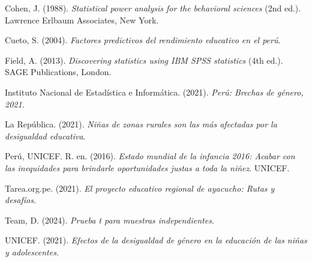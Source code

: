 \documentclass[
]{article}
\newlength{\cslhangindent}
\newenvironment{CSLReferences}[2] %
 {\begin{list}{}{%
  \setlength{\itemindent}{0pt}
  \setlength{\leftmargin}{0pt}
  \setlength{\parsep}{0pt}
  \ifodd #1
   \setlength{\leftmargin}{\cslhangindent}
   \setlength{\itemindent}{-1\cslhangindent}
  \fi
  \setlength{\itemsep}{#2\baselineskip}}}
 {\end{list}}
\begin{document}
\label{refs}
\begin{CSLReferences}{1}{0}
Cohen, J. (1988). \emph{Statistical power analysis for the behavioral
sciences} (2nd ed.). Lawrence Erlbaum Associates, New York.

Cueto, S. (2004). \emph{Factores predictivos del rendimiento educativo
en el per{ú}}.

Field, A. (2013). \emph{Discovering statistics using {IBM SPSS}
statistics} (4th ed.). SAGE Publications, London.

Instituto Nacional de Estadística e Informática. (2021). \emph{Per{ú}:
Brechas de g{é}nero, 2021}.

La República. (2021). \emph{Ni{ñ}as de zonas rurales son las m{á}s
afectadas por la desigualdad educativa}.

Perú, UNICEF. R. en. (2016). \emph{Estado mundial de la infancia 2016:
Acabar con las inequidades para brindarle oportunidades justas a toda la
niñez}. UNICEF.

Tarea.org.pe. (2021). \emph{El proyecto educativo regional de ayacucho:
Rutas y desaf{í}os}.

Team, D. (2024). \emph{Prueba t para muestras independientes}.

UNICEF. (2021). \emph{Efectos de la desigualdad de g{é}nero en la
educaci{ó}n de las ni{ñ}as y adolescentes}.

\end{CSLReferences}
\end{document}
